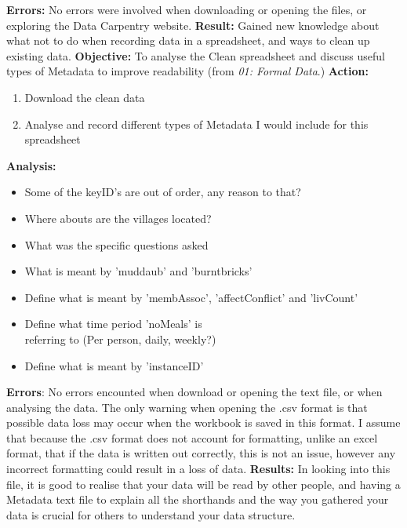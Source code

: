 \documentclass{article}
\begin{document}
\textbf{Errors:} No errors were involved when downloading or opening the files, or exploring the Data Carpentry website.
\newline
\textbf{Result:} Gained new knowledge about what not to do when recording data in a spreadsheet, and ways to clean up existing data.
\vspace{5mm}
\newline
\textbf{Objective:} To analyse the Clean spreadsheet and discuss useful types of Metadata to improve readability (from \textit{01: Formal Data}.)
\newline
\textbf{Action:}
\begin{enumerate}
    \item Download the clean data
    \item Analyse and record different types of Metadata I would include for this spreadsheet
\end{enumerate}
\textbf{Analysis:}
\begin{itemize}
    \item Some of the keyID's are out of order, any reason to that?
    \item Where abouts are the villages located?
    \item What was the specific questions asked
    \item What is meant by 'muddaub' and 'burntbricks'
    \item Define what is meant by 'membAssoc', 'affectConflict' and 'livCount'
    \item Define what time period 'noMeals' is \\ referring to (Per person, daily, weekly?)
    \item Define what is meant by 'instanceID'
\end{itemize}
\textbf{Errors}: No errors encounted when download or opening the text file, or when analysing the data. The only warning when opening the .csv format is that possible data loss may occur when the workbook is saved in this format. I assume that because the .csv format does not account for formatting, unlike an excel format, that if the data is written out correctly, this is not an issue, however any incorrect formatting could result in a loss of data.
\newline
\textbf{Results:} In looking into this file, it is good to realise that your data will be read by other people, and having a Metadata text file to explain all the shorthands and the way you gathered your data is crucial for others to understand your data structure. 
\end{document}
